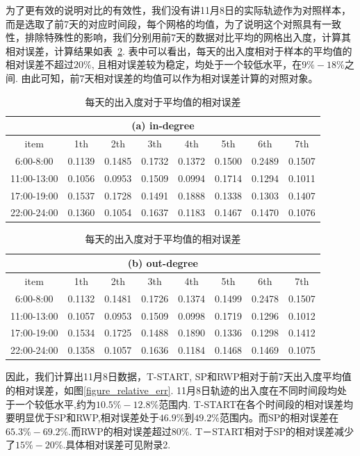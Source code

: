 为了更有效的说明对比的有效性，我们没有讲11月8日的实际轨迹作为对照样本，而是选取了前7天的对应时间段，每个网格的均值，为了说明这个对照具有一致性，排除特殊性的影响，我们分别用前7天的数据对比平均的网格出入度，计算其相对误差，计算结果如表~\ref{table_relative_err_avg}. 表中可以看出，每天的出入度相对于样本的平均值的相对误差不超过$20\%$, 且相对误差较为稳定，均处于一个较低水平，在$9\%-18\%$之间.
由此可知，前7天相对误差的均值可以作为相对误差计算的对照对象。
\begin{table}[!t]
\centering
\caption{每天的出入度对于平均值的相对误差}\label{table_relative_err_avg}
\begin{tabular}[c]{c|c|c|c|c|c|c|c}
\multicolumn{8}{c}{(a) in-degree}\\
\hline
item& 1th&2th&3th&4th&5th&6th&7th\\
\hline
6:00-8:00&
0.1139& 
0.1485&
0.1732&
0.1372&
0.1500&
0.2489&
0.1507\\
11:00-13:00&
0.1056&
0.0953&
0.1509&
0.0994&
0.1714&
0.1294&
0.1011\\
17:00-19:00&
0.1537&
0.1728&
0.1491&
0.1888&
0.1338&
0.1303&
0.1407\\
22:00-24:00&
0.1360&
0.1054&
0.1637&
0.1183&
0.1467&
0.1470&
0.1076\\
\hline
\end{tabular}
\begin{tabular}[c]{c|c|c|c|c|c|c|c}
\multicolumn{8}{c}{(b) out-degree}\\
\hline
item& 1th&2th&3th&4th&5th&6th&7th\\
\hline
6:00-8:00&
0.1132&
0.1481&
0.1726&
0.1374&
0.1499&
0.2478&
0.1507\\
11:00-13:00&
0.1057&
0.0953&
0.1509&
0.0998&
0.1719&
0.1296&
0.1012\\
17:00-19:00&
0.1534&
0.1725&
0.1488&
0.1890&
0.1336&
0.1298&
0.1412\\
22:00-24:00&
0.1358&
0.1057&
0.1636&
0.1184&
0.1468&
0.1469&
0.1075\\
\hline
\end{tabular}
\end{table}

因此，我们计算出11月8日数据，T-START, SP和RWP相对于前7天出入度平均值的相对误差，如图\ref{figure_relative_err}. 11月8日轨迹的出入度在不同时间段均处于一个较低水平,约为$10.5\%-12.8\%$范围内. T-START在各个时间段的相对误差均要明显优于SP和RWP,相对误差处于$46.9\%到49.2\%$范围内。而SP的相对误差在$65.3\%-69.2\%$.而RWP的相对误差超过$80\%$. T－START相对于SP的相对误差减少了$15\%-20\%$.具体相对误差可见附录2.

